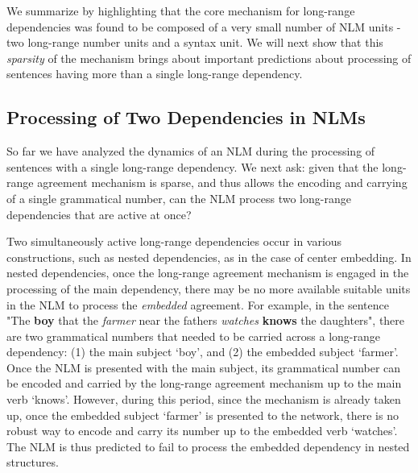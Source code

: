 \vspace{10pt}

We summarize by highlighting that the core mechanism for long-range dependencies was found to be composed of a very small number of NLM units - two long-range number units and a syntax unit. We will next show that this \textit{sparsity} of the mechanism brings about important predictions about processing of sentences having more than a single long-range dependency.

\subsection{Processing of Two Dependencies in NLMs}
So far we have analyzed the dynamics of an NLM during the processing of sentences with a single long-range dependency. We next ask: given that the long-range agreement mechanism is sparse, and thus allows the encoding and carrying of a single grammatical number, can the NLM process two long-range dependencies that are active at once?

Two simultaneously active long-range dependencies occur in various constructions, such as nested dependencies, as in the case of center embedding. In nested dependencies, once the long-range agreement mechanism is engaged in the processing of the main dependency, there may be no more available suitable units in the NLM to process the \textit{embedded} agreement. For example, in the sentence "The \textbf{boy} that the \textit{farmer} near the fathers \textit{watches} \textbf{knows} the daughters", there are two grammatical numbers that needed to be carried across a long-range dependency: (1) the main subject `boy', and (2) the embedded subject `farmer'. Once the NLM is presented with the main subject, its grammatical number can be encoded and carried by the long-range agreement mechanism up to the main verb `knows'. However, during this period, since the mechanism is already taken up, once the embedded subject `farmer' is presented to the network, there is no robust way to encode and carry its number up to the embedded verb `watches'. The NLM is thus predicted to fail to process the embedded dependency in nested structures.


